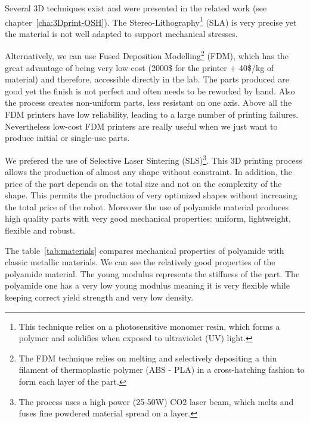 Several 3D techniques exist and were presented in the related work (see chapter~\ref{cha:3Dprint-OSH}). The Stereo-Lithography\footnote{This technique relies on a photosensitive monomer resin, which forms a polymer and solidifies when exposed to ultraviolet (UV) light.} (SLA) is very precise yet the material is not well adapted to support mechanical stresses.

Alternatively, we can use Fused Deposition Modelling\footnote{The FDM technique relies on melting and selectively depositing a thin filament of thermoplastic polymer (ABS - PLA) in a cross-hatching fashion to form each layer of the part.} (FDM), which has the great advantage of being very low cost (2000\$ for the printer + 40\$/kg of material) and therefore, accessible directly in the lab. The parts produced are good yet the finish is not perfect and often needs to be reworked by hand. Also the process creates non-uniform parts, less resistant on one axis. Above all the FDM printers have low reliability, leading to a large number of printing failures. Nevertheless low-cost FDM printers are really useful when we just want to produce initial or single-use parts.

We prefered the use of Selective Laser Sintering (SLS)\footnote{The process uses a high power (25-50W) CO2 laser beam, which melts and fuses fine powdered material spread on a layer.}. This 3D printing process allows the production of almost any shape without constraint. In addition, the price of the part depends on the total size and not on the complexity of the shape. This permits the production of very optimized shapes without increasing the total price of the robot. Moreover the use of polyamide material produces high quality parts with very good mechanical properties: uniform, lightweight, flexible and robust.

The table~\ref{tab:materials} compares mechanical properties of polyamide with classic metallic materials. We can see the relatively good properties of the polyamide material. The young modulus represents the stiffness of the part. The polyamide one has a very low young modulus meaning it is very flexible while keeping correct yield strength and very low density.


